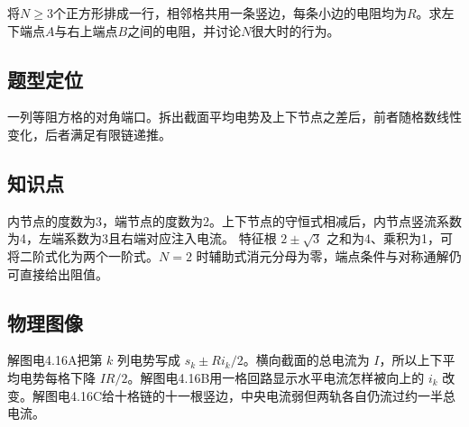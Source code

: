 \documentclass[UTF8,fontset=fandol,a4paper,11pt]{ctexart}
\newcommand{\figcaption}[1]{\par\vspace{2pt}{\small\color{muted}#1}\par}
\begin{document}
将$N\ge3$个正方形排成一行，相邻格共用一条竖边，每条小边的电阻均为$R$。求左下端点$A$与右上端点$B$之间的电阻，并讨论$N$很大时的行为。

\begin{center}\begin{minipage}{.98\linewidth}\centering
{}
\figcaption{图电4.16\quad 一般有限长度的梯形网}
\end{minipage}\end{center}



\subsection*{题型定位}

一列等阻方格的对角端口。拆出截面平均电势及上下节点之差后，前者随格数线性变化，后者满足有限链递推。



\subsection*{知识点}

内节点的度数为3，端节点的度数为2。上下节点的守恒式相减后，内节点竖流系数为4，左端系数为3且右端对应注入电流。
特征根 $2\pm\sqrt3$ 之和为4、乘积为1，可将二阶式化为两个一阶式。$N=2$ 时辅助式消元分母为零，端点条件与对称通解仍可直接给出阻值。



\subsection*{物理图像}

解图电4.16A把第 $k$ 列电势写成 $s_k\pm Ri_k/2$。横向截面的总电流为 $I$，所以上下平均电势每格下降 $IR/2$。解图电4.16B用一格回路显示水平电流怎样被向上的 $i_k$ 改变。解图电4.16C给十格链的十一根竖边，中央电流弱但两轨各自仍流过约一半总电流。
\end{document}
